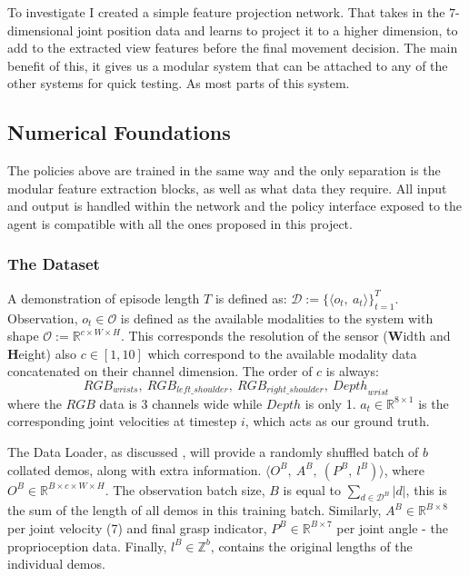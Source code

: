 To investigate I created a simple feature projection network. That takes in the $7$-dimensional joint position data and learns to project it to a higher dimension, to add to the extracted view features before the final movement decision. The main benefit of this, it gives us a modular system that can be attached to any of the other systems for quick testing. As most parts of this system.

\subsection{Numerical Foundations}

The policies above are trained in the same way and the only separation is the modular feature extraction blocks, as well as what data they require. All input and output is handled within the network and the policy interface exposed to the agent is compatible with all the ones proposed in this project.

\subsubsection{The Dataset}
A demonstration of episode length $T$ is defined as: \(\mathcal{D} := \{\langle o_t, ~a_t\rangle\}_{t = 1}^{T} \). Observation, \(o_t \in \mathcal{O}\) is defined as the available modalities to the system with shape \(\mathcal{O} := \mathbb{R}^{c \times W \times H}\). This corresponds the resolution of the sensor (\textbf{W}idth and \textbf{H}eight) also $c \in \left[1, 10\right]$ which correspond to the available modality data concatenated on their channel dimension. The order of $c$ is always:
\[
{RGB}_{wrists}, ~{RGB}_{{left}\_{shoulder}}, ~{RGB}_{{right}\_{shoulder}}, ~{Depth}_{wrist}
\] 
where the $RGB$ data is $3$ channels wide while $Depth$ is only 1. \(a_t \in \mathbb{R}^{8 \times 1}\) is the corresponding joint velocities at timestep $i$, which acts as our ground truth. 

The Data Loader, as discussed , will provide a randomly shuffled batch of $b$ collated demos, along with extra information. \( \langle O^B, ~A^B, ~\left( P^B, ~l^B \right) \rangle\), where \(O^B \in \mathbb{R}^{ B \times c \times W \times H}\). The observation batch size, $B$ is equal to \({\sum_{ d \in \mathcal{D}^B}|d|}\), this is the sum of the length of all demos in this training batch. Similarly, \(A^B \in \mathbb{R}^{B \times 8}\) per joint velocity (7) and final grasp indicator, \(P^B \in \mathbb{R}^{B \times 7}\) per joint angle - the proprioception data. Finally, \(l^B \in \mathbb{Z}^{b}\), contains the original lengths of the individual demos.

